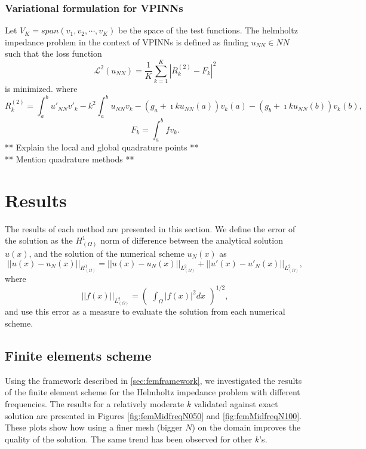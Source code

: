 \subsubsection{Variational formulation for VPINNs}\label{sec:vpinnsformulation}
Let $V_K = span(v_1, v_2, \cdots, v_K)$ be the space of the test functions. The helmholtz impedance problem in the context
of VPINNs is defined as finding $u_{NN} \in NN$ such that the loss function
\begin{equation}
    \label{eq:lossfunction}
    \mathcal{L}^2(u_{NN}) = \frac{1}{K} \sum_{k=1}^{K}{|R_k^{(2)} - F_k|^2}
\end{equation}
is minimized. where
\begin{equation}
    \label{eq:vpinnrhs}
    R_k^{(2)} = \int_{a}^{b}{u'_{NN}v'_k} - k^2 \int_{a}^{b}{u_{NN}v_k} - (g_a + \imath ku_{NN}(a))v_k(a) - (g_b + \imath ku_{NN}(b))v_k(b),
\end{equation}
\begin{equation}
    \label{eq:vpinnlhs}
    F_k = \int_{a}^{b}{fv_k}.
\end{equation}
** Explain the local and global quadrature points **\\
** Mention quadrature methods **


\section{Results}\label{sec:results}
The results of each method are presented in this section. We define the error of the solution as the $H^1_{(\Omega)}$
norm of difference between the analytical solution $u(x)$, and the solution of the numerical scheme $u_N(x)$ as
\begin{equation}
    \label{eq:H1error}
    ||u(x) - u_N(x)||_{H^1_{(\Omega)}} = ||u(x) - u_N(x)||_{L^2_{(\Omega)}} + ||u'(x) - u'_N(x)||_{L^2_{(\Omega)}},
\end{equation}
where
\begin{equation}
    \label{eq:L2error}
    ||f(x)||_{L^2_{(\Omega)}} = \begin{pmatrix} \int_{\Omega}{|f(x)|^2dx} \end{pmatrix}^{1/2},
\end{equation}
and use this error as a measure to evaluate the solution from each numerical scheme.

\subsection{Finite elements scheme}\label{sec:femresults}
Using the framework described in \autoref{sec:femframework}, we investigated the results of the finite element scheme
for the Helmholtz impedance problem with different frequencies. The results for a relatively moderate $k$  validated
against exact solution are presented in Figures \ref{fig:femMidfreqN050} and \ref{fig:femMidfreqN100}. These plots show how using a finer mesh (bigger $N$)
on the domain improves the quality of the solution. The same trend has been observed for other $k$'s.

